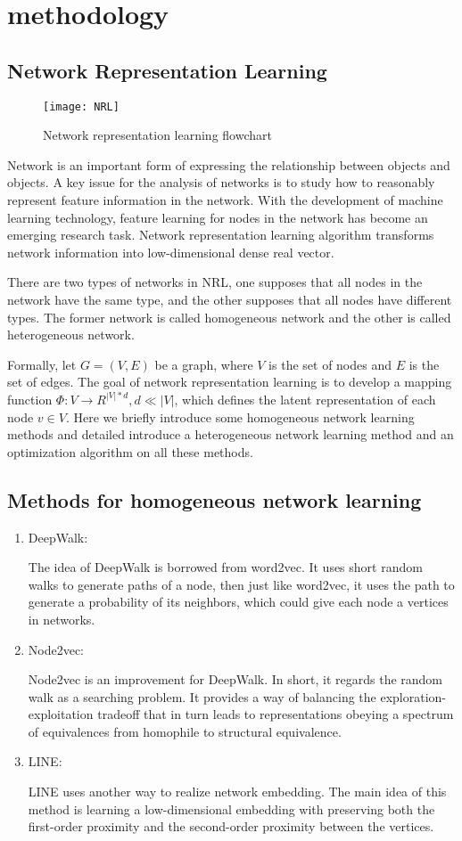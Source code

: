 \documentclass[conference]{IEEEtran}
\begin{document}
\section{methodology}
\subsection{Network Representation Learning}
\begin{figure}[h]
\centering
\texttt{[image: NRL]}
\caption{Network representation learning flowchart}
\label{fig_NRL}
\end{figure}
Network is an important form of expressing the relationship between objects and objects. A key issue for the analysis of networks is to study how to reasonably represent feature information in the network. With the development of machine learning technology, feature learning for nodes in the network has become an emerging research task. Network representation learning algorithm transforms network information into low-dimensional dense real vector. 

There are two types of networks in NRL, one supposes that all nodes in the network have the same type, and the other supposes that all nodes have different types. The former network is called homogeneous network and the other is called heterogeneous network.

Formally, let $G=(V,E)$ be a graph, where $V$ is the set of nodes and $E$ is the set of edges. The goal of network representation learning is to develop a mapping function $\Phi:V\rightarrow R^{|V|*d},d\ll|V|$, which defines the latent representation of each node $v\in V$. Here we briefly introduce some homogeneous network learning methods and detailed introduce a heterogeneous network learning method and an optimization algorithm on all these methods.
\subsection*{Methods for homogeneous network learning}
\begin{enumerate}
	\item DeepWalk:
	
	The idea of DeepWalk\cite{Perozzi:2014:DOL:2623330.2623732} is borrowed from word2vec. It uses short random walks to generate paths of a node, then just like word2vec, it uses the path to generate a probability of its neighbors, which could give each node a vertices in networks.
		\item Node2vec:
		
		Node2vec\cite{DBLP:journals/corr/GroverL16} is an improvement for DeepWalk. In short, it regards the random walk as a searching problem. It provides a way of balancing the exploration-exploitation tradeoff that in turn leads to representations obeying a spectrum of equivalences from homophile to structural equivalence.
	\item LINE:
	
	LINE\cite{tang2015line} uses another way to realize network embedding. The main idea of this method is learning a low-dimensional embedding with preserving both the first-order proximity and the second-order proximity between the vertices.
\end{enumerate}
\end{document}
